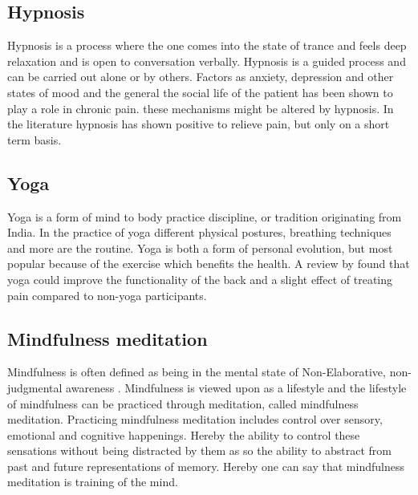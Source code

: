 \subsection{Hypnosis}
Hypnosis is a process where the one comes into the state of trance and feels deep relaxation and is open to conversation verbally. Hypnosis is a guided process and can be carried out alone or by others. \cite{Gerald2013} Factors as anxiety, depression and other states of mood and the general the social life of the patient has been shown to play a role in chronic pain. these mechanisms might be altered by hypnosis.
In the literature hypnosis has shown positive to relieve pain, but only on a short term basis. \cite{Dhanani2011}

\subsection{Yoga}
Yoga is a form of mind to body practice discipline, or tradition originating from India. In the practice of yoga different physical postures, breathing techniques and more are the routine. 
Yoga is both a form of personal evolution, but most popular because of the exercise which benefits the health.
A review by \cite{Whitehead2017} found that yoga could improve the functionality of the back and a slight effect of treating pain compared to non-yoga participants. 

\subsection{Mindfulness meditation}
Mindfulness is often defined as being in the mental state of Non-Elaborative, non-judgmental awareness \cite{Zeidan2012,Zeidan2016,Tang2017}. 
Mindfulness is viewed upon as a lifestyle and the lifestyle of mindfulness can be practiced through meditation, called mindfulness meditation. Practicing mindfulness meditation includes control over sensory, emotional and cognitive happenings. Hereby the ability to control these sensations without being distracted by them as so the ability to abstract from past and future representations of memory. Hereby one can say that mindfulness meditation is training of the mind. \cite{Tang2017}


